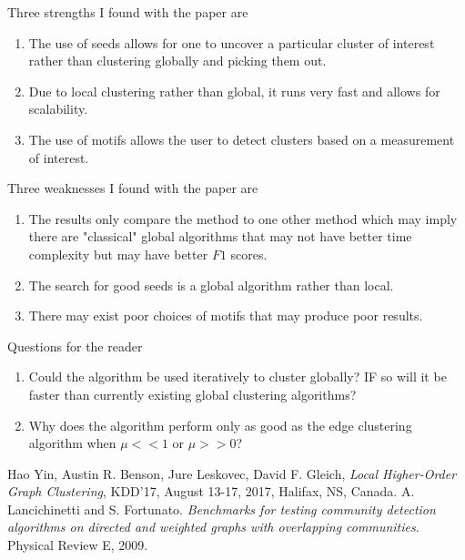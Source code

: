 \documentclass[12pt]{article}
\theoremstyle{remark}
\begin{document}
Three strengths I found with the paper are
\begin{enumerate}
	\item The use of seeds allows for one to uncover a particular cluster of interest rather than clustering globally and picking them out.
	\item Due to local clustering rather than global, it runs very fast and allows for scalability.
	\item The use of motifs allows the user to detect clusters based on a measurement of interest.
\end{enumerate} 
\vspace{0.5cm}

Three weaknesses I found with the paper are
\begin{enumerate}
	\item The results only compare the method to one other method which may imply there are "classical" global algorithms that may not have better time complexity but may have better $F1$ scores.
	\item The search for good seeds is a global algorithm rather than local.
	\item There may exist poor choices of motifs that may produce poor results. 
\end{enumerate}
\vspace{0.5cm}

Questions for the reader
\begin{enumerate}
	\item Could the algorithm be used iteratively to cluster globally? IF so will it be faster than currently existing global clustering algorithms?
	\item Why does the algorithm perform only as good as the edge clustering algorithm when $\mu << 1$ or $\mu >> 0$?
\end{enumerate}
\vspace{0.5cm}

\begin{thebibliography}{unsrt}
	Hao Yin, Austin R. Benson, Jure Leskovec, David F. Gleich, \emph{Local Higher-Order Graph Clustering}, KDD’17, August 13-17, 2017, Halifax, NS, Canada.
	A. Lancichinetti and S. Fortunato. \emph{Benchmarks for testing community detection algorithms on directed and weighted graphs with overlapping communities}. Physical Review E, 2009.
\end{thebibliography}
\end{document}
